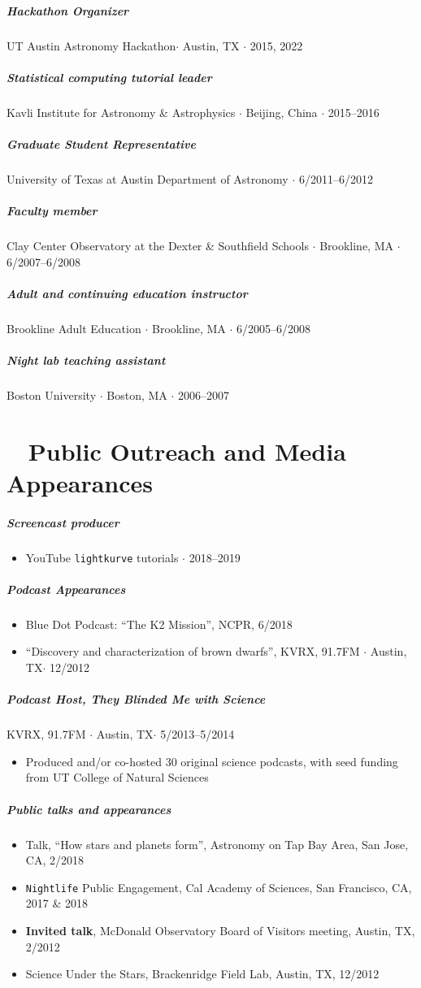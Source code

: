 \documentclass[10pt,letterpaper]{article}
\begin{document}
\subparagraph{Hackathon Organizer}
UT Austin Astronomy Hackathon$\cdot$ Austin, TX $\cdot$ 2015, 2022

\subparagraph{Statistical computing tutorial leader}
Kavli Institute for Astronomy \& Astrophysics $\cdot$ Beijing, China $\cdot$ 2015--2016

\subparagraph{Graduate Student Representative}
University of Texas at Austin Department of Astronomy $\cdot$ 6/2011--6/2012

\subparagraph{Faculty member}
Clay Center Observatory at the Dexter \& Southfield Schools  $\cdot$ Brookline, MA $\cdot$ 6/2007--6/2008

\subparagraph{Adult and continuing education instructor}
Brookline Adult Education  $\cdot$ Brookline, MA $\cdot$ 6/2005--6/2008

\subparagraph{Night lab teaching assistant}
Boston University $\cdot$ Boston, MA $\cdot$ 2006--2007

\section*{\faYoutube ~ Public Outreach and Media Appearances}

\subparagraph{Screencast producer}
	\begin{itemize}
      \item YouTube \texttt{lightkurve} tutorials $\cdot$ 2018--2019
	\end{itemize}


\subparagraph{Podcast Appearances}
	\begin{itemize}
      \item Blue Dot Podcast: ``The K2 Mission'', NCPR, 6/2018
      \item ``Discovery and characterization of brown dwarfs'', KVRX, 91.7FM $\cdot$ Austin, TX$\cdot$ 12/2012
	\end{itemize}

\subparagraph{Podcast Host, \emph{They Blinded Me with Science} }
KVRX, 91.7FM $\cdot$ Austin, TX$\cdot$ 5/2013--5/2014
	\begin{itemize}
	    \item Produced and/or co-hosted 30 original science podcasts, with seed funding from UT College of Natural Sciences
	\end{itemize}

\subparagraph{Public talks and appearances}
	\begin{itemize}
    \item Talk, ``How stars and planets form'', Astronomy on Tap Bay Area, San Jose, CA, 2/2018
    \item \texttt{Nightlife} Public Engagement, Cal Academy of Sciences, San Francisco, CA, 2017 \& 2018
    \item \textbf{Invited talk}, McDonald Observatory Board of Visitors meeting, Austin, TX, 2/2012
    \item Science Under the Stars, Brackenridge Field Lab, Austin, TX, 12/2012
	\end{itemize}
\end{document}
